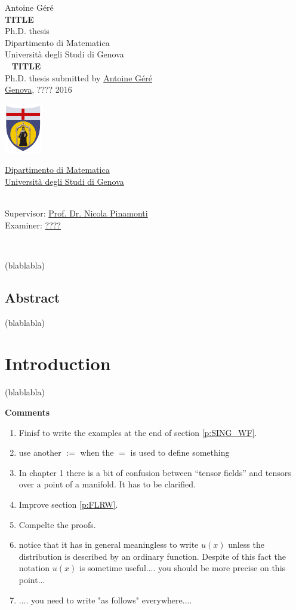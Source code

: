\documentclass[11pt]{book}
\makeatletter
\newcommand*{\makepagetitle}{%
%
{\raggedright%
%
%
%
%
\thispagestyle{empty}%
%
\vspace*{50pt}
%
{\Large Antoine Géré}\\%
%
\vspace*{120pt}%
%
{\Huge\bfseries TITLE}\\[\baselineskip]%
%
\vspace*{60pt}%
%
{\Large Ph.D. thesis}\\[\baselineskip]%
%
\vspace*{80pt}%
%
{\Large Dipartimento di Matematica}\\[\baselineskip]%
%
\vspace*{1pt}
%
{\Large Università degli Studi di Genova}\\[\baselineskip]%
%
\vfill%
%
%
\newpage%
%
\thispagestyle{empty}%
%
\ \vfill%
%
%
\textbf{TITLE} \\[2pt] %
Ph.D. thesis submitted by \href{mailto:gere@dima.unige.it}{Antoine Géré} \\[1pt]
\href{http://www.comune.genova.it/}{Genova}, ???? 2016 \\[10pt]
%
%
\begin{minipage}{0.1\linewidth}
\includegraphics[scale=1]{unige.pdf}
\end{minipage}
%
\begin{minipage}{0.85\linewidth}
\href{http://www.dima.unige.it/}{Dipartimento di Matematica} \\[1pt]
\href{http://www.unige.it/}{Università degli Studi di Genova}
\end{minipage}
%
%
\vspace*{10pt} \\
Supervisor: \href{mailto:pinamont@dima.unige.it}{Prof. Dr. Nicola Pinamonti} \\[1pt]
%
Examiner: \href{mailto:????@????.com}{????}
%
%
%
%
}%
%
}%
\theoremstyle{break}
\makeatother
\begin{document}




\makepagetitle




\newpage


\ \vfill


(blablabla)



\vfill


\newpage
\vspace*{100pt}
\section*{Abstract}


(blablabla)




\tableofcontents


\chapter*{Introduction}


(blablabla)


\vspace*{50pt}
\noindent
\textbf{Comments}


\begin{enumerate}


\item Finisf to write the examples at the end of section \ref{p:SING_WF}.


\item use another $:=$ when the $=$ is used to define something


\item In chapter 1 there is a bit of confusion between ``tensor fields'' and tensors over a point of a manifold. It has to be clarified.


\item Improve section \ref{p:FLRW}.


\item Compelte the proofs.


\item notice that it has in general meaningless to write $u(x)$ unless the distribution is described by an ordinary function. Despite of this fact the notation $u(x)$ is sometime useful.... you should be more precise on this point...


\item .... you need to write "as follows" everywhere.... 

\end{enumerate}
\end{document}

